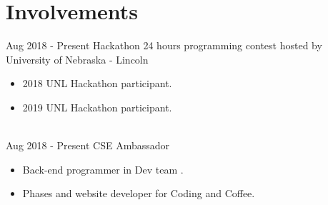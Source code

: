 \documentclass[letterpaper]{twentysecondcv} %
\begin{document}

\section{Involvements}
\begin{twenty}
	
    \twentyitem
    	{Aug 2018}
		{- Present}
        {Hackathon}
        {}
        {24 hours programming contest hosted by University of Nebraska - Lincoln}
        {
        {\begin{itemize}
        \item 2018 UNL Hackathon participant.
        \item 2019 UNL Hackathon participant.
		\end{itemize}}
        }
    \\
    \twentyitem
    	{Aug 2018}
		{- Present}
        {CSE Ambassador}
        {}
        {}
        {
        {\begin{itemize}
        \item Back-end programmer in Dev team .
        \item Phases and website developer for Coding and Coffee.
		\end{itemize}}
        }
\end{twenty}
\end{document}
